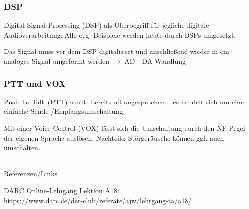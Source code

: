 \begin{frame}
  \frametitle{DSP}

  Digital Signal Processing (DSP) als Überbegriff für jegliche digitale
  Audioverarbeitung. Alle o.\,g. Beispiele werden heute durch DSPs umgesetzt.

  \bigskip

  Das Signal muss vor dem DSP digitalisiert und anschließend wieder in ein
  analoges Signal umgeformt werden $\rightarrow$ AD---DA-Wandlung

\end{frame}

\begin{frame}
  \frametitle{PTT und VOX}

  Push To Talk (PTT) wurde bereits oft angesprochen -- es handelt sich um eine
  einfache Sende-/Empfangsumschaltung.

  \bigskip

  Mit einer Voice Control (VOX) lässt sich die Umschaltung durch den NF-Pegel
  der eigenen Sprache auslösen. Nachteile: Störgeräusche können ggf. auch
  umschalten.

\end{frame}

\renewcommand{\refname}{Referenzen}

\hypertarget{refs}{}
\textcolor{white}{} \\ %
\Large Referenzen/Links
\footnotesize

\begin{thebibliography}{}
    DARC Online-Lehrgang Lektion A18:\\
    \url{https://www.darc.de/der-club/referate/ajw/lehrgang-ta/a18/}
\end{thebibliography}


